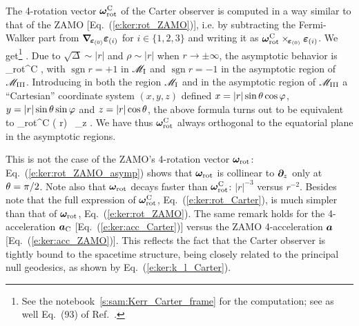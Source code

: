 The 4-rotation vector $\bm{\omega}_{\rm rot}^{\rm C}$ of the Carter observer is computed in a way similar to that
of the ZAMO [Eq.~(\ref{e:ker:rot_ZAMO})], i.e. by subtracting the Fermi-Walker part from $\bm{\nabla}_{\!\bm{\varepsilon}_{(0)}} \bm{\varepsilon}_{(i)}$
for $i\in\{1,2,3\}$ and writing it as $\bm{\omega}_{\rm rot}^{\rm C}\times_{\!\bm{\varepsilon}_{(0)}} \bm{\varepsilon}_{(i)}$. We get\footnote{See the notebook~\ref{s:sam:Kerr_Carter_frame} for the computation; see as well Eq.~(93) of Ref.~\cite{Semer93}.}
\be \label{e:ker:rot_Carter}
    .
\ee
Due to $\sqrt{\Delta} \sim |r|$ and $\rho\sim |r|$ when $r\to\pm\infty$,
the asymptotic behavior is
\be \label{e:ker:rot_Carter_asymp}
   \w{\omega}_{\rm rot}^{\rm C} 
     ,
\ee
with $\operatorname{sgn} r = +1$ in $\mathscr{M}_{\rm I}$ and $\operatorname{sgn} r = -1$ in the asymptotic region of
$\mathscr{M}_{\rm III}$. Introducing in both the region $\mathscr{M}_{\rm I}$ and in the asymptotic region of
$\mathscr{M}_{\rm III}$ a ``Cartesian'' coordinate system $(x,y,z)$ defined $x=|r|\sin\theta\cos\varphi$,
$y=|r|\sin\theta\sin\varphi$ and $z=|r|\cos\theta$,
the above formula turns out to be equivalent to
\be
    \w{\omega}_{\rm rot}^{\rm C} 
   ( r)  \, \wpar_z .
\ee
We have thus $\bm{\omega}_{\rm rot}^{\rm C}$ always orthogonal to the equatorial plane in the asymptotic regions.
\begin{remark}
This is not the case of the ZAMO's 4-rotation vector $\bm{\omega}_{\rm rot}$: Eq.~(\ref{e:ker:rot_ZAMO_asymp})
shows that $\bm{\omega}_{\rm rot}$ is collinear to $\bm{\partial}_z$ only at $\theta=\pi/2$.
Note also that $\bm{\omega}_{\rm rot}$ decays faster than
$\bm{\omega}_{\rm rot}^{\rm C}$: $|r|^{-3}$ versus $r^{-2}$.
Besides note that the full expression of $\bm{\omega}_{\rm rot}^{\rm C}$, Eq.~(\ref{e:ker:rot_Carter}),
is much simpler than that of $\bm{\omega}_{\rm rot}$, Eq.~(\ref{e:ker:rot_ZAMO}).
The same remark holds for the 4-acceleration $\bm{a}_{\rm C}$ [Eq.~(\ref{e:ker:acc_Carter})] versus
the ZAMO 4-acceleration $\bm{a}$ [Eq.~(\ref{e:ker:acc_ZAMO})]. This reflects the fact that
the Carter observer is tightly bound to the spacetime structure, being closely related to
the principal null geodesics, as shown by Eq.~(\ref{e:ker:k_l_Carter}).
\end{remark}


